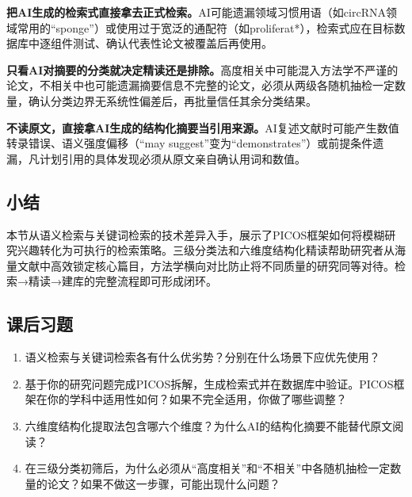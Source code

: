 \begin{mistakebox}

\textbf{把AI生成的检索式直接拿去正式检索。}AI可能遗漏领域习惯用语（如circRNA领域常用的``sponge''）或使用过于宽泛的通配符（如proliferat*），检索式应在目标数据库中逐组件测试、确认代表性论文被覆盖后再使用。

\smallskip

\textbf{只看AI对摘要的分类就决定精读还是排除。}高度相关中可能混入方法学不严谨的论文，不相关中也可能遗漏摘要信息不完整的论文，必须从两级各随机抽检一定数量，确认分类边界无系统性偏差后，再批量信任其余分类结果。

\smallskip

\textbf{不读原文，直接拿AI生成的结构化摘要当引用来源。}AI复述文献时可能产生数值转录错误、语义强度偏移（``may suggest''变为``demonstrates''）或前提条件遗漏，凡计划引用的具体发现必须从原文亲自确认用词和数值。

\end{mistakebox}

\subsection*{小结}
本节从语义检索与关键词检索的技术差异入手，展示了PICOS框架如何将模糊研究兴趣转化为可执行的检索策略。三级分类法和六维度结构化精读帮助研究者从海量文献中高效锁定核心篇目，方法学横向对比防止将不同质量的研究同等对待。检索→精读→建库的完整流程即可形成闭环。

\bigskip
\subsection*{课后习题}
\begin{enumerate}
\setlength{\itemsep}{6pt}

\item 语义检索与关键词检索各有什么优劣势？分别在什么场景下应优先使用？

\item 基于你的研究问题完成PICOS拆解，生成检索式并在数据库中验证。PICOS框架在你的学科中适用性如何？如果不完全适用，你做了哪些调整？

\item 六维度结构化提取法包含哪六个维度？为什么AI的结构化摘要不能替代原文阅读？

\item 在三级分类初筛后，为什么必须从``高度相关''和``不相关''中各随机抽检一定数量的论文？如果不做这一步骤，可能出现什么问题？

\end{enumerate}
\newpage

